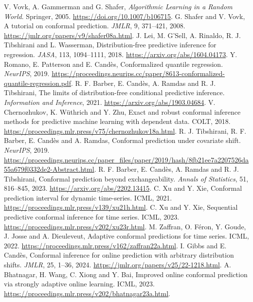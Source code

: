  V. Vovk, A. Gammerman and G. Shafer, \emph{Algorithmic Learning in a Random World}. Springer, 2005. \url{https://doi.org/10.1007/b106715}.
 G. Shafer and V. Vovk, A tutorial on conformal prediction. \emph{JMLR}, 9, 371--421, 2008. \url{https://jmlr.org/papers/v9/shafer08a.html}.
 J. Lei, M. G'Sell, A. Rinaldo, R. J. Tibshirani and L. Wasserman, Distribution-free predictive inference for regression. \emph{JASA}, 113, 1094--1111, 2018. \url{https://arxiv.org/abs/1604.04173}.
 Y. Romano, E. Patterson and E. Cand\`es, Conformalized quantile regression. \emph{NeurIPS}, 2019. \url{https://proceedings.neurips.cc/paper/8613-conformalized-quantile-regression.pdf}.
 R. F. Barber, E. Cand\`es, A. Ramdas and R. J. Tibshirani, The limits of distribution-free conditional predictive inference. \emph{Information and Inference}, 2021. \url{https://arxiv.org/abs/1903.04684}.
 V. Chernozhukov, K. W\"uthrich and Y. Zhu, Exact and robust conformal inference methods for predictive machine learning with dependent data. COLT, 2018. \url{https://proceedings.mlr.press/v75/chernozhukov18a.html}.
 R. J. Tibshirani, R. F. Barber, E. Cand\`es and A. Ramdas, Conformal prediction under covariate shift. \emph{NeurIPS}, 2019. \url{https://proceedings.neurips.cc/paper_files/paper/2019/hash/8fb21ee7a2207526da55a679f0332de2-Abstract.html}.
 R. F. Barber, E. Cand\`es, A. Ramdas and R. J. Tibshirani, Conformal prediction beyond exchangeability. \emph{Annals of Statistics}, 51, 816--845, 2023. \url{https://arxiv.org/abs/2202.13415}.
 C. Xu and Y. Xie, Conformal prediction interval for dynamic time-series. ICML, 2021. \url{https://proceedings.mlr.press/v139/xu21h.html}.
 C. Xu and Y. Xie, Sequential predictive conformal inference for time series. ICML, 2023. \url{https://proceedings.mlr.press/v202/xu23r.html}.
 M. Zaffran, O. F\'eron, Y. Goude, J. Josse and A. Dieuleveut, Adaptive conformal predictions for time series. ICML, 2022. \url{https://proceedings.mlr.press/v162/zaffran22a.html}.
 I. Gibbs and E. Cand\`es, Conformal inference for online prediction with arbitrary distribution shifts. \emph{JMLR}, 25, 1--36, 2024. \url{https://jmlr.org/papers/v25/22-1218.html}.
 A. Bhatnagar, H. Wang, C. Xiong and Y. Bai, Improved online conformal prediction via strongly adaptive online learning. ICML, 2023. \url{https://proceedings.mlr.press/v202/bhatnagar23a.html}.
